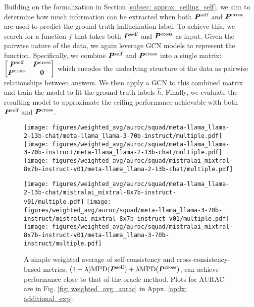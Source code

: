 Building on the formalization in Section \ref{subsec: approx_ceiling_self}, we aim to determine how much information can be extracted when both ${\bm{P}}^{\text{self}}$ and ${\bm{P}}^{\text{cross}}$ are used to predict the ground truth hallucination label. To achieve this, we search for a function $f$ that takes both ${\bm{P}}^{\text{self}}$ and ${\bm{P}}^{\text{cross}}$ as input. Given the pairwise nature of the data, we again leverage GCN models to represent the function. Specifically, we combine ${\bm{P}}^{\text{self}}$ and ${\bm{P}}^{\text{cross}}$ into a single matrix: $\begin{bmatrix}
{\bm{P}}^{\text{self}} & {\bm{P}}^{\text{cross}}\\
{\bm{P}}^{\text{cross}} & \mathbf{0}
\end{bmatrix}$
which encodes the underlying structure of the data as pairwise relationships between answers. We then apply a GCN to this combined matrix and train the model to fit the ground truth labels $\hat{h}$. Finally, we evaluate the resulting model to approximate the ceiling performance achievable with both ${\bm{P}}^{\text{self}}$ and ${\bm{P}}^{\text{cross}}$.

\begin{figure}[!t]
\centering
\texttt{[image: figures/weighted\_avg/auroc/squad/meta-llama\_llama-2-13b-chat/meta-llama\_llama-3-70b-instruct/multiple.pdf]}
\texttt{[image: figures/weighted\_avg/auroc/squad/meta-llama\_llama-3-70b-instruct/meta-llama\_llama-2-13b-chat/multiple.pdf]}
\texttt{[image: figures/weighted\_avg/auroc/squad/mistralai\_mixtral-8x7b-instruct-v01/meta-llama\_llama-2-13b-chat/multiple.pdf]}

\texttt{[image: figures/weighted\_avg/auroc/squad/meta-llama\_llama-2-13b-chat/mistralai\_mixtral-8x7b-instruct-v01/multiple.pdf]}
\texttt{[image: figures/weighted\_avg/auroc/squad/meta-llama\_llama-3-70b-instruct/mistralai\_mixtral-8x7b-instruct-v01/multiple.pdf]}
\texttt{[image: figures/weighted\_avg/auroc/squad/mistralai\_mixtral-8x7b-instruct-v01/meta-llama\_llama-3-70b-instruct/multiple.pdf]}
\vspace{-.2cm}
\caption{A simple weighted average of self-consistency and cross-consistency-based metrics, $(1-\lambda) \text{MPD}({\bm{P}}^{\text{self}}) + \lambda \text{MPD}({\bm{P}}^{\text{cross}})$, can achieve performance close to that of the oracle method. Plots for AURAC are in Fig. \ref{fig: weighted_avg_aurac} in Appx. \ref{apdx: additional_exp}.
}
\label{fig: weighted_avg}
\vspace{-.3cm}
\end{figure}

